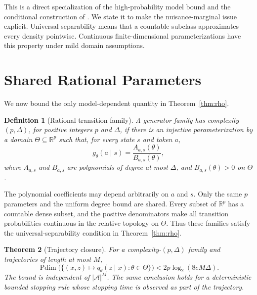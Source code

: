 \documentclass[twoside]{article}
\newtheorem{theorem}{Theorem}
\newtheorem{definition}[theorem]{Definition}
\newcommand{\A}{\mathcal A}
\newcommand{\R}{\mathbb R}
\newcommand{\Pdim}{\operatorname{Pdim}}
\begin{document}
This is a direct specialization of the high-probability model bound and the conditional construction of \citet{baraud2018}. We state it to make the nuisance-marginal issue explicit. Universal separability means that a countable subclass approximates every density pointwise. Continuous finite-dimensional parameterizations have this property under mild domain assumptions.

\section{Shared Rational Parameters}
\label{sec:rational}

We now bound the only model-dependent quantity in Theorem~\ref{thm:rho}.

\begin{definition}[Rational transition family]
\label{def:rational}
A generator family has complexity $(p,\Delta)$, for positive integers $p$ and $\Delta$, if there is an injective parameterization by a domain $\Theta\subseteq\R^p$ such that, for every state $s$ and token $a$,
\[
 g_\theta(a\mid s)=\frac{A_{a,s}(\theta)}{B_{a,s}(\theta)},
\]
where $A_{a,s}$ and $B_{a,s}$ are polynomials of degree at most $\Delta$, and $B_{a,s}(\theta)>0$ on $\Theta$.
\end{definition}

The polynomial coefficients may depend arbitrarily on $a$ and $s$. Only the same $p$ parameters and the uniform degree bound are shared. Every subset of $\R^p$ has a countable dense subset, and the positive denominators make all transition probabilities continuous in the relative topology on $\Theta$. Thus these families satisfy the universal-separability condition in Theorem~\ref{thm:rho}.

\begin{theorem}[Trajectory closure]
\label{thm:closure}
For a complexity-$(p,\Delta)$ family and trajectories of length at most $M$,
\begin{equation}
 \Pdim\bigl(\{(x,z)\mapsto q_\theta(z\mid x):\theta\in\Theta\}\bigr)
 <2p\log_2(8eM\Delta).
 \label{eq:pdim-bound}
\end{equation}
The bound is independent of $|\A|^M$. The same conclusion holds for a deterministic bounded stopping rule whose stopping time is observed as part of the trajectory.
\end{theorem}
\end{document}
